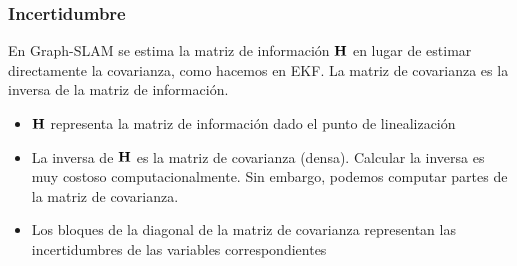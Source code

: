 \begin{frame}
    

\end{frame}


\begin{frame}
    \frametitle{Incertidumbre}
    
    En Graph-SLAM se estima la matriz de información $\boldsymbol{\mathbf{H}}$ en lugar de estimar directamente la covarianza, como hacemos en EKF. La matriz de covarianza es la inversa de la matriz de información.
    
    \begin{itemize}
        \item $\boldsymbol{\mathbf{H}}$ representa la matriz de información dado el punto de linealización
        \item La inversa de $\boldsymbol{\mathbf{H}}$ es la matriz de covarianza (densa). Calcular la inversa es muy costoso computacionalmente. Sin embargo, podemos computar partes de la matriz de covarianza.
        \item Los bloques de la diagonal de la matriz de covarianza representan las incertidumbres de las variables correspondientes
    \end{itemize}
\end{frame}

